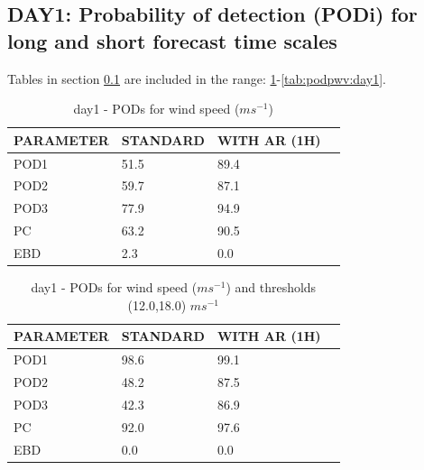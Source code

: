 \subsection{DAY1: Probability of detection (PODi) for long and short forecast time scales}\label{subsec:day1:pod}
Tables in section \ref{subsec:day1:pod} are included in the range: \ref{tab:podws:day1}-\ref{tab:podpwv:day1}.
\begin{table}[h!]
\begin{center}
\begin{tabular}{|l|l|l|l|}
\hline
\multicolumn{1}{|c|}{\cellcolor[HTML]{C0C0C0}\textbf{PARAMETER}} & \multicolumn{1}{c|}{\cellcolor[HTML]{C0C0C0}\textbf{STANDARD}} & \multicolumn{1}{c|}{\cellcolor[HTML]{C0C0C0}\textbf{WITH AR (1H)}} \\
\hline
\cellcolor[HTML]{C0C0C0}POD1  & 51.5                                & 89.4         \\
\cellcolor[HTML]{C0C0C0}POD2  & 59.7                                & 87.1         \\
\cellcolor[HTML]{C0C0C0}POD3  & 77.9                                & 94.9         \\
\cellcolor[HTML]{C0C0C0}PC    & 63.2                                  & 90.5           \\
\cellcolor[HTML]{C0C0C0}EBD   & 2.3                                 & 0.0          \\
\hline
\end{tabular}
\caption{day1 - PODs for wind speed ($m s^{-1}$)}
\label{tab:podws:day1}
\end{center}
\end{table}
\begin{table}[h!]
\begin{center}
\begin{tabular}{|l|l|l|l|}
\hline
\multicolumn{1}{|c|}{\cellcolor[HTML]{C0C0C0}\textbf{PARAMETER}} & \multicolumn{1}{c|}{\cellcolor[HTML]{C0C0C0}\textbf{STANDARD}} & \multicolumn{1}{c|}{\cellcolor[HTML]{C0C0C0}\textbf{WITH AR (1H)}} \\
\hline
\cellcolor[HTML]{C0C0C0}POD1  & 98.6   & 99.1         \\
\cellcolor[HTML]{C0C0C0}POD2  & 48.2   & 87.5         \\
\cellcolor[HTML]{C0C0C0}POD3  & 42.3   & 86.9         \\
\cellcolor[HTML]{C0C0C0}PC    & 92.0     & 97.6           \\
\cellcolor[HTML]{C0C0C0}EBD   & 0.0    & 0.0          \\
\hline
\end{tabular}
\caption{day1 - PODs for wind speed ($m s^{-1}$) and thresholds (12.0,18.0) $m s^{-1}$}
\label{tab:podwsFT:day1}
\end{center}
\end{table}
